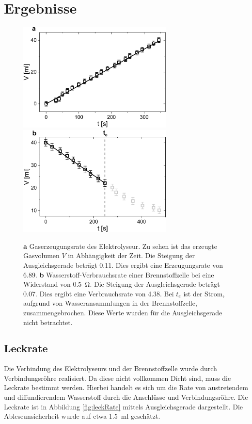 \documentclass[a4paper,usenatbib]{aspdoc}
\begin{document}
        
            
    \section{Ergebnisse}\label{sec:result}
            \begin{figure}
                \centering
                \includegraphics[width=78mm]{graphs/elekWirkung1.png}
                \includegraphics[width=78mm]{graphs/brennWirkung1.png}
                \caption{
                    \textbf{a} Gaserzeugungsrate des Elektrolyseur. Zu sehen ist das erzeugte Gasvolumen $V$ in Abhängigkeit der Zeit. Die Steigung der Ausgleichsgerade beträgt \SI{0,11}{}. Dies ergibt eine Erzeugungsrate von \SI{6,89}{}.
                    \textbf{b} Wasserstoff-Verbrauchsrate einer Brennstoffzelle bei eine Widerstand von \SI{0,5}{\ohm}. Die Steigung der Ausgleichsgerade beträgt \SI{0,07}{}. Dies ergibt eine Verbrauchsrate von \SI{4,38}{}. Bei $t_e$ ist der Strom, aufgrund von Wasseransammlungen in der Brennstoffzelle, zusammengebrochen. Diese Werte wurden für die Ausgleichsgerade nicht betrachtet.
                }
                \label{fig:rate}
            \end{figure}
    
        \subsection{Leckrate}\label{subsec:leck}
            Die Verbindung des Elektrolyseurs und der Brennstoffzelle wurde durch Verbindungsröhre realisiert. Da diese nicht vollkommen Dicht sind, muss die Leckrate bestimmt werden. Hierbei handelt es sich um die Rate von austretendem und diffundierendem Wasserstoff durch die Anschlüsse und Verbindungsröhre. Die Leckrate ist in Abbildung \ref{fig:leckRate} mittels Ausgleichsgerade dargestellt. Die Ableseunsicherheit wurde auf etwa \SI{1,5}{\milli\litre} geschätzt. 
            
\end{document}
